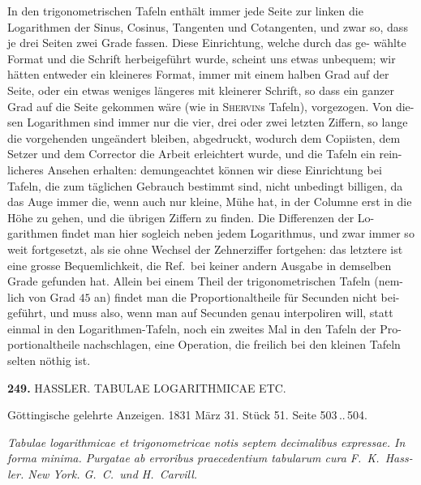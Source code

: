 \documentclass[12pt,a4paper]{article}
\begin{document}
\smallskip\noindent
In den trigonometrischen Tafeln enthält immer jede Seite zur linken die
Logarithmen der Sinus, Cosinus, Tangenten und Cotangenten, und zwar so,
dass je drei Seiten zwei Grade fassen. Diese Einrichtung, welche durch das ge-
wählte Format und die Schrift herbeigeführt wurde, scheint uns etwas unbequem;
wir hätten entweder ein kleineres Format, immer mit einem halben Grad auf der
Seite, oder ein etwas weniges längeres mit kleinerer Schrift, so dass ein ganzer
Grad auf die Seite gekommen wäre (wie in \textsc{Shervin}s Tafeln), vorgezogen. Von die-
sen Logarithmen sind immer nur die vier, drei oder zwei letzten Ziffern, so lange
die vorgehenden ungeändert bleiben, abgedruckt, wodurch dem Copiisten, dem
Setzer und dem Corrector die Arbeit erleichtert wurde, und die Tafeln ein rein-
licheres Ansehen erhalten: demungeachtet können wir diese Einrichtung bei
Tafeln, die zum täglichen Gebrauch bestimmt sind, nicht unbedingt billigen, da
das Auge immer die, wenn auch nur kleine, Mühe hat, in der Columne erst in
die Höhe zu gehen, und die übrigen Ziffern zu finden. Die Differenzen der Lo-
garithmen findet man hier sogleich neben jedem Logarithmus, und zwar immer
so weit fortgesetzt, als sie ohne Wechsel der Zehnerziffer fortgehen: das letztere
ist eine grosse Bequemlichkeit, die Ref.\ bei keiner andern Ausgabe in demselben
Grade gefunden hat. Allein bei einem Theil der trigonometrischen Tafeln (nem-
lich von Grad $45$ an) findet man die Proportionaltheile für Secunden nicht bei-
geführt, und muss also, wenn man auf Secunden genau interpoliren will, statt
einmal in den Logarithmen-Tafeln, noch ein zweites Mal in den Tafeln der Pro-
portionaltheile nachschlagen, eine Operation, die freilich bei den kleinen Tafeln
selten nöthig ist.

\newpage
\noindent\textbf{249.}\quad
HASSLER. TABULAE LOGARITHMICAE ETC.

\smallskip\noindent
Göttingische gelehrte Anzeigen. 1831 März 31. Stück 51. Seite 503\,..\,504.

\smallskip\noindent
\textit{Tabulae logarithmicae et trigonometricae notis septem decimalibus expressae.
In forma minima. Purgatae ab erroribus praecedentium tabularum cura F.~K.~Hass-
ler. New York. G.~C.\ und H.~Carvill.}
\end{document}
